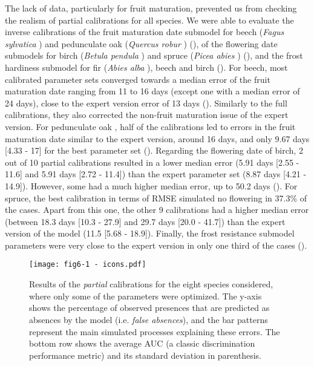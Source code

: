 \documentclass[letterpaper,8pt]{extarticle}  %
\begin{document}
\begin{doublespacing}
\begin{linenumbers}
The lack of data, particularly for fruit maturation, prevented us from checking the realism of partial calibrations for all species. We were able to evaluate the inverse calibrations of the fruit maturation date submodel for beech (\emph{\emph{Fagus sylvatica} }) and pedunculate oak (\emph{Quercus robur} ) (), of the flowering date submodels for birch (\emph{\emph{Betula pendula} }) and spruce  (\emph{\emph{Picea abies} }) (), and the frost hardiness submodel for fir (\emph{\emph{Abies alba} }), beech and birch (). For beech, most calibrated parameter sets converged towards a median error of the fruit maturation date ranging from 11 to 16 days (except one with a median error of 24 days), close to the expert version error of 13 days (). Similarly to the full calibrations, they also corrected the non-fruit maturation issue of the expert version. For pedunculate oak , half of the calibrations led to errors in the fruit maturation date similar to the expert version, around 16 days, and only 9.67 days [4.33 - 17] for the best parameter set (). Regarding the flowering date of birch, 2 out of 10 partial calibrations resulted in a lower median error (5.91 days [2.55 - 11.6] and 5.91 days [2.72 - 11.4]) than the expert parameter set (8.87 days [4.21 - 14.9]). However, some had a much higher median error, up to 50.2 days (). For spruce, the best calibration in terms of RMSE simulated no flowering in 37.3\% of the cases. Apart from this one, the other 9 calibrations had a higher median error (between 18.3 days [10.3 - 27.9] and 29.7 days [20.0 - 41.7]) than the expert version of the model (11.5 [5.68 - 18.9]). Finally, the frost resistance submodel parameters were very close to the expert version in only one third of the cases ().



\begin{figure}[htpb]
\hspace*{-0.5cm}
\centering
\texttt{[image: fig6-1 - icons.pdf]}
\caption{Results of the \emph{partial} calibrations for the eight species considered, where only some of the parameters were optimized. The y-axis shows the percentage of observed presences that are predicted as absences by the model (i.e. \emph{false absences}), and the bar patterns represent the main simulated processes explaining these errors. The bottom row shows the average AUC (a classic discrimination performance metric) and its standard deviation in parenthesis.}
\label{fig:4}
\end{figure}


\end{linenumbers}
\end{doublespacing}
\end{document}
